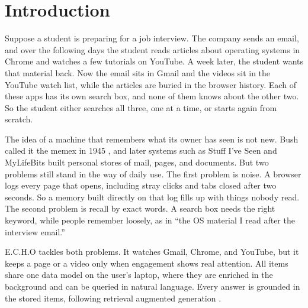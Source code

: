 \documentclass[conference]{IEEEtran}
\begin{document}
\section{Introduction}
Suppose a student is preparing for a job interview. The company sends an email, and over the following days the student reads articles about operating systems in Chrome and watches a few tutorials on YouTube. A week later, the student wants that material back. Now the email sits in Gmail and the videos sit in the YouTube watch list, while the articles are buried in the browser history. Each of these apps has its own search box, and none of them knows about the other two. So the student either searches all three, one at a time, or starts again from scratch.

The idea of a machine that remembers what its owner has seen is not new. Bush called it the memex in 1945 \cite{b1}, and later systems such as Stuff I've Seen \cite{b2} and MyLifeBits \cite{b3} built personal stores of mail, pages, and documents. But two problems still stand in the way of daily use. The first problem is noise. A browser logs every page that opens, including stray clicks and tabs closed after two seconds. So a memory built directly on that log fills up with things nobody read. The second problem is recall by exact words. A search box needs the right keyword, while people remember loosely, as in ``the OS material I read after the interview email.''

E.C.H.O tackles both problems. It watches Gmail, Chrome, and YouTube, but it keeps a page or a video only when engagement shows real attention. All items share one data model on the user's laptop, where they are enriched in the background and can be queried in natural language. Every answer is grounded in the stored items, following retrieval augmented generation \cite{b4}.
\end{document}
